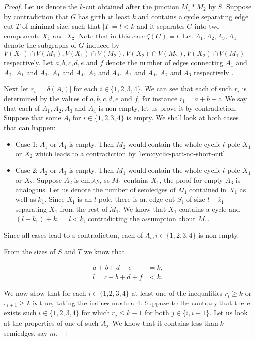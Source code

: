\begin{proof}
	Let us denote the $k$-cut obtained after the junction $M_1*M_2$ by $S$. Suppose by contradiction that $G$ has girth at least $k$ and contains a cycle separating edge cut $T$ of minimal size, such that $|T|=l<k$ and it separates $G$ into two components $X_1$ and $X_2$. Note that in this case $\zeta(G)=l$. Let $A_1,A_2,A_3,A_4$ denote the subgraphs of $G$ induced by $V(X_1)\cap V(M_1), V(X_1)\cap V(M_2), V(X_2)\cap V(M_2), V(X_2)\cap V(M_1)$ respectively. Let $a,b,c,d,e$ and $f$ denote the number of edges connecting $A_1$ and $A_2$, $A_1$ and $A_3$, $A_1$ and $A_4$, $A_2$ and $A_4$, $A_3$ and $A_4$, $A_2$ and $A_3$ respectively .
	
	Next let $r_i=|\delta(A_i)|$ for each $i\in\{1,2,3,4\}$. We can see that each of such $r_i$ is determined by the values of $a,b,c,d,e$ and $f$, for instance $r_1=a+b+c$. We say that each of $A_1, A_2,A_3$ and $A_4$ is non-empty, let us prove it by contradiction. Suppose that some $A_i$ for $i\in\{1,2,3,4\}$ is empty. We shall look at both cases that can happen:
	
	\begin{itemize}
		\item Case 1: $A_1$ or $A_4$ is empty. Then $M_2$ would contain the whole cyclic $l$-pole $X_1$ or $X_2$ which leads to a contradiction by \cref{lem:cyclic-part-no-short-cut}.
		\item Case 2: $A_2$ or $A_3$ is empty. Then $M_1$ would contain the whole cyclic $l$-pole $X_1$ or $X_2$. Suppose $A_2$ is empty, so $M_1$ contains $X_1$, the proof for empty $A_3$ is analogous. Let us denote the number of semiedges of $M_1$ contained in $X_1$ as well as $k_1$. Since $X_1$ is an $l$-pole, there is an edge cut $S_1$ of size $l-k_1$ separating $X_1$ from the rest of $M_1$. We know that $X_1$ contains a cycle and $(l-k_1)+k_1=l<k$, contradicting the assumption about $M_1$.
	\end{itemize}

	Since all cases lead to a contradiction, each of $A_i, i\in\{1,2,3,4\}$ is non-empty.
	
	From the sizes of $S$ and $T$ we know that
	
	\begin{align}
		a+b+d+e &= k, \label{abde_eq_k}\\
		l=c+b+d+f &< k. \label{cbdf_smaller_k}
	\end{align}

	We now show that for each $i\in\{1,2,3,4\}$ at least one of the inequalities $r_i\geq k$ or $r_{i+1}\geq k$ is true, taking the indices modulo 4. Suppose to the contrary that there exists such $i\in\{1,2,3,4\}$ for which $r_j\leq k-1$ for both $j\in\{i, i+1\}$. Let us look at the properties of one of such $A_j$. We know that it contains less than $k$ semiedges, say $m$.
	

\end{proof}
